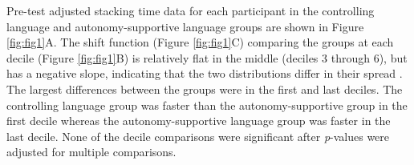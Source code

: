 \documentclass[man,floatsintext,donotrepeattitle,letterpaper,12pt]{apa7}
\begin{document}
Pre-test adjusted stacking time data for each participant in the controlling language and autonomy-supportive language groups are shown in Figure \ref{fig:fig1}A. The shift function (Figure \ref{fig:fig1}C) comparing the groups at each decile (Figure \ref{fig:fig1}B) is relatively flat in the middle (deciles 3 through 6), but has a negative slope, indicating that the two distributions differ in their spread \autocite{R-rogme}. The largest differences between the groups were in the first and last deciles. The controlling language group was faster than the autonomy-supportive group in the first decile whereas the autonomy-supportive language group was faster in the last decile. None of the decile comparisons were significant after \emph{p}-values were adjusted for multiple comparisons.

\clearpage
\end{document}
